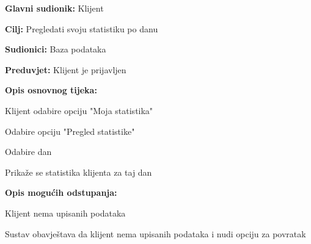 				\noindent {}
				\begin{packed_item}
					
					\item \textbf{Glavni sudionik:} Klijent
					\item  \textbf{Cilj:} Pregledati svoju statistiku po danu
					\item  \textbf{Sudionici:} Baza podataka
					\item  \textbf{Preduvjet:} Klijent je prijavljen
					\item  \textbf{Opis osnovnog tijeka:}
					
					\item[] \begin{packed_enum}
						
						\item Klijent odabire opciju "Moja statistika"
						\item Odabire opciju "Pregled statistike" 
						\item Odabire dan
						\item Prikaže se statistika klijenta za taj dan
						
					\end{packed_enum}
				
					\item  \textbf{Opis mogućih odstupanja:}
					
					\item[] \begin{packed_item}
						
						\item[2.a] Klijent nema upisanih podataka 
						\item[] \begin{packed_enum}
							
							\item Sustav obavještava da klijent nema upisanih podataka i nudi opciju za povratak
						\end{packed_enum}
						
					\end{packed_item}
					
				\end{packed_item}
			
